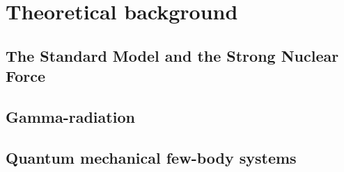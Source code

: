 \chapter{Theoretical background}
\section{The Standard Model and the Strong Nuclear Force}
\section{Gamma-radiation}
\section{Quantum mechanical few-body systems}